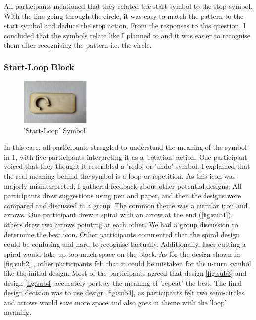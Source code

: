 \documentclass[oneside,%
                    author={Malak Hajji},
                    degree={BSc},
                    title={Designing An Accessible Ozobot Programming Platform for Students},
                  subtitle={With Mixed Visual Abilities}]{dissertation}
\begin{document}
All participants mentioned that they related the start symbol to the stop symbol. With the line going through the circle, it was easy to match the pattern to the start symbol and deduce the stop action. From the responses to this question, I concluded that the symbols relate like I planned to and it was easier to recognise them after recognising the pattern i.e. the circle. 

\subsubsection{Start-Loop Block}

\FloatBarrier
\begin{figure}[h]
    \centering
    \includegraphics[width=0.3\textwidth]{thesis/loopstart.eps}
    \caption{'Start-Loop' Symbol}
    \label{fig-startloop}
\end{figure}
\FloatBarrier
In this case, all participants struggled to understand the meaning of the symbol in \ref{fig-startloop}, with five participants interpreting it as a 'rotation' action. One participant voiced that they thought it resembled a 'redo' or 'undo' symbol. I explained that the real meaning behind the symbol is a loop or repetition. As this icon was majorly misinterpreted, I gathered feedback about other potential designs. All participants drew suggestions using pen and paper, and then the designs were compared and discussed in a group. The common theme was a circular icon and arrows. One participant drew a spiral with an arrow at the end (\ref{fig:sub1}), others drew two arrows pointing at each other. We had a group discussion to determine the best icon. Other participants commented that the spiral design could be confusing and hard to recognise tactually. Additionally, laser cutting a spiral would take up too much space on the block. As for the design shown in \ref{fig:sub2} , other participants felt that it could be mistaken for the u-turn symbol like the initial design. Most of the participants agreed that design \ref{fig:sub3} and design \ref{fig:sub4} accurately portray the meaning of 'repeat' the best. The final design decision was to use design \ref{fig:sub4}, as participants felt two semi-circles and arrows would save more space and also goes in theme with the 'loop' meaning.
\end{document}
